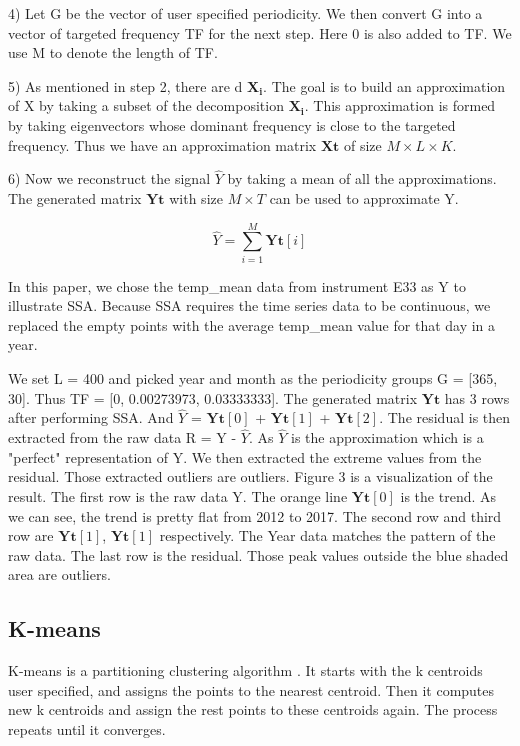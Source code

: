 \documentclass[letterpaper, 10 pt, conference]{ieeeconf}  %
\begin{document}
4) Let G be the vector of user specified periodicity. We then convert G into a vector of targeted frequency TF for the next step. Here 0 is also added to TF. We use M to denote the length of TF.

5) As mentioned in step 2, there are d $\mathbf{X_i}$. The goal is to build an approximation of X by taking a subset of the decomposition $\mathbf{X_i}$. This approximation is formed by taking eigenvectors whose dominant frequency is close to the targeted frequency. Thus we have an approximation matrix $\mathbf{Xt}$ of size $M \times L \times K$.

6) Now we reconstruct the signal $\hat{Y}$ by taking a mean of all the approximations. The generated matrix $\mathbf{Yt}$ with size $M \times T$ can be used to approximate Y.

\begin{equation}
\hat{Y} =  \displaystyle\sum_{i=1}^{M} \mathbf{Yt}[i]
\end{equation}

In this paper, we chose the temp\_mean data from instrument E33 as Y to illustrate SSA. Because SSA requires the time series data to be continuous, we replaced the empty points with the average temp\_mean value for that day in a year. 

We set L = 400 and picked year and month as the periodicity groups G = [365, 30]. Thus TF = [0, 0.00273973, 0.03333333]. The generated matrix $\mathbf{Yt}$ has 3 rows after performing SSA. And $\hat{Y}$ = $\mathbf{Yt}[0]$ + $\mathbf{Yt}[1]$ + $\mathbf{Yt}[2]$. The residual is then extracted from the raw data R = Y - $\hat{Y}$. As $\hat{Y}$ is the approximation which is a "perfect" representation of Y. We then extracted the extreme values from the residual. Those extracted outliers are outliers. Figure 3 is a visualization of the result. The first row is the raw data Y. The orange line $\mathbf{Yt}[0]$ is the trend. As we can see, the trend is pretty flat from 2012 to 2017. The second row and third row are $\mathbf{Yt}[1]$, $\mathbf{Yt}[1]$ respectively. The Year data matches the pattern of the raw data. The last row is the residual. Those peak values outside the blue shaded area are outliers.

\subsection{K-means}
K-means is a partitioning clustering algorithm \cite{macqueen1967some, hartigan1979algorithm}. It starts with the k centroids user specified, and assigns the points to the nearest centroid. Then it computes new k centroids and assign the rest points to these centroids again. The process repeats until it converges. 
\end{document}
